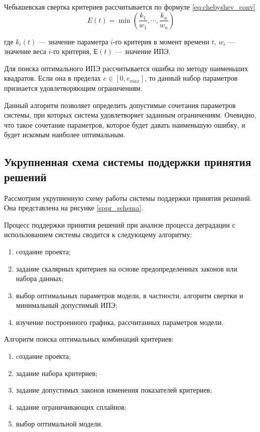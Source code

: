 Чебышевская свертка критериев рассчитывается по формуле \ref{eq:chebyshev_conv}
\begin{equation}
    \label{eq:chebyshev_conv}
    E(t) = \min(\frac{k_1}{w_1}, \cdots, \frac{k_n}{w_n})
\end{equation}

\noindent
где $k_i(t)$ --- значение параметра $i$-го критерия в момент времени $t$,
$w_i$ --- значение веса $i$-го критерия,
$Е(t)$ --- значение ИПЭ.

Для поиска оптимального ИПЭ рассчитывается ошибка по методу наименьших квадратов. 
Если она в пределах $e \in [0,e_{max}]$, то данный набор параметров признается удовлетворяющим ограничениям.

Данный алгоритм позволяет определить допустимые сочетания параметров системы, при которых система удовлетворяет заданным ограничениям. 
Очевидно, что такое сочетание параметров, которое будет давать наименьшую ошибку, и будет искомым наиболее оптимальным.

\subsection{Укрупненная схема системы поддержки принятия решений}
Рассмотрим укрупненную схему работы системы поддержки принятия решений.
Она представлена на рисунке \ref{sppr_schema}.


Процесс поддержки принятия решений при анализе процесса деградации с использованием системы сводится к следующему алгоритму:
\begin{enumerate}
  \item cоздание проекта;
  \item задание скалярных критериев на основе предопределенных законов или набора данных;
  \item выбор оптимальных параметров модели, в частности, алгоритм свертки и минимальный допустимый ИПЭ;
  \item изучение построенного графика, рассчитанных параметров модели.
\end{enumerate}

Алгоритм поиска оптимальных комбинаций критериев:
\begin{enumerate}
  \item cоздание проекта;
  \item задание набора критериев;
  \item задание допустимых законов изменения показателей критериев;
  \item задание ограничивающих сплайнов;
  \item выбор оптимальной модели.
\end{enumerate}

